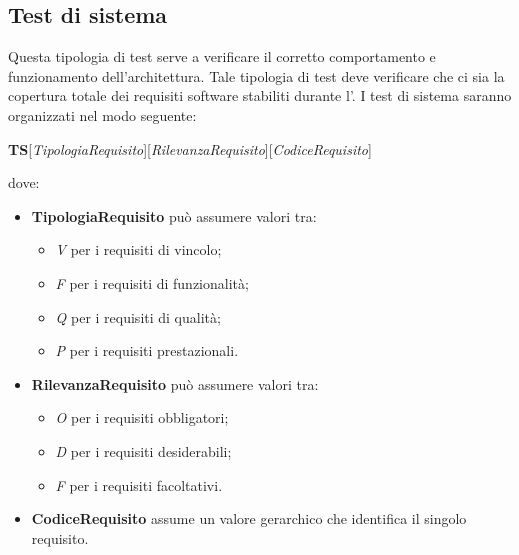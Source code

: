 	\subsection{Test di sistema}
	Questa tipologia di test serve a verificare il corretto comportamento e funzionamento dell’architettura. Tale tipologia di test deve verificare che ci sia la copertura totale dei requisiti software stabiliti durante l'\AdR.
	I test di sistema saranno organizzati nel modo seguente:
	\begin{center}
		\textbf{TS}[\textit{TipologiaRequisito}][\textit{RilevanzaRequisito}][\textit{CodiceRequisito}]
	\end{center}
	dove:
	\begin{itemize}
		\item
		\textbf{TipologiaRequisito} può assumere valori tra:
		\begin{itemize}
			\item
			\textit{V} per i requisiti di vincolo;
			\item
			\textit{F} per i requisiti di funzionalità;
			\item
			\textit{Q} per i requisiti di qualità;
			\item
			\textit{P} per i requisiti prestazionali.
		\end{itemize}
		\item 
		\textbf{RilevanzaRequisito} può assumere valori tra:
		\begin{itemize}
			\item
			\textit{O} per i requisiti obbligatori;
			\item
			\textit{D} per i requisiti desiderabili;
			\item
			\textit{F} per i requisiti facoltativi.
		\end{itemize}
		\item
		\textbf{CodiceRequisito} assume un valore gerarchico che identifica il singolo requisito.
	\end{itemize}
	

